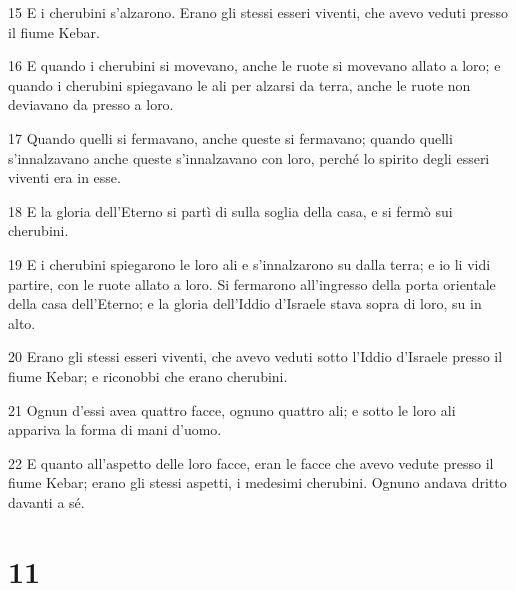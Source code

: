 \par 15 E i cherubini s'alzarono. Erano gli stessi esseri viventi, che avevo veduti presso il fiume Kebar.
\par 16 E quando i cherubini si movevano, anche le ruote si movevano allato a loro; e quando i cherubini spiegavano le ali per alzarsi da terra, anche le ruote non deviavano da presso a loro.
\par 17 Quando quelli si fermavano, anche queste si fermavano; quando quelli s'innalzavano anche queste s'innalzavano con loro, perché lo spirito degli esseri viventi era in esse.
\par 18 E la gloria dell'Eterno si partì di sulla soglia della casa, e si fermò sui cherubini.
\par 19 E i cherubini spiegarono le loro ali e s'innalzarono su dalla terra; e io li vidi partire, con le ruote allato a loro. Si fermarono all'ingresso della porta orientale della casa dell'Eterno; e la gloria dell'Iddio d'Israele stava sopra di loro, su in alto.
\par 20 Erano gli stessi esseri viventi, che avevo veduti sotto l'Iddio d'Israele presso il fiume Kebar; e riconobbi che erano cherubini.
\par 21 Ognun d'essi avea quattro facce, ognuno quattro ali; e sotto le loro ali appariva la forma di mani d'uomo.
\par 22 E quanto all'aspetto delle loro facce, eran le facce che avevo vedute presso il fiume Kebar; erano gli stessi aspetti, i medesimi cherubini. Ognuno andava dritto davanti a sé.

\chapter{11}

